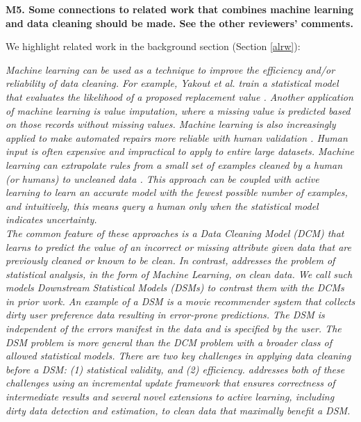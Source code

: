\vspace{0.5em}

\noindent\textbf{M5. Some connections to related work that combines machine learning and data cleaning should be made. See the other reviewers' comments.}

We highlight related work in the background section (Section \ref{alrw}):

\emph{Machine learning can be used as a technique to improve the efficiency and/or reliability of data cleaning\cite{yakout2013don,gokhale2014corleone}.
For example, Yakout et al. train a statistical model that evaluates the likelihood of a proposed replacement value \cite{yakout2013don}.
Another application of machine learning is value imputation, where a missing value is predicted based on those records without missing values.
Machine learning is also increasingly applied to make automated repairs more reliable with human validation \cite{DBLP:journals/pvldb/YakoutENOI11}.
Human input is often expensive and impractical to apply to entire large datasets.
Machine learning can extrapolate rules from a small set of examples cleaned by a human (or humans) to uncleaned data \cite{gokhale2014corleone, DBLP:journals/pvldb/YakoutENOI11}.
This approach can be coupled with active learning \cite{DBLP:journals/pvldb/MozafariSFJM14} to learn an accurate model with the fewest possible number of examples, and intuitively, this means
query a human only when the statistical model indicates uncertainty.\\
The common feature of these approaches is a Data Cleaning Model (DCM) that learns to predict the value of an incorrect or missing attribute given data that are previously cleaned or known to be clean.
In contrast, \sys addresses the problem of statistical analysis, in the form of Machine Learning, on clean data.
We call such models Downstream Statistical Models (DSMs) to contrast them with the DCMs in prior work.
An example of a DSM is a movie recommender system that collects dirty user preference data resulting in error-prone predictions.
The DSM is independent of the errors manifest in the data and is specified by the user.
The DSM problem is more general than the DCM problem with a broader class of allowed statistical models.
There are two key challenges in applying data cleaning before a DSM: (1) statistical validity, and (2) efficiency. 
\sys addresses both of these challenges using an incremental update framework that ensures correctness of intermediate results and several novel extensions to active learning, including dirty data detection and estimation, to clean data that maximally benefit a DSM.}

